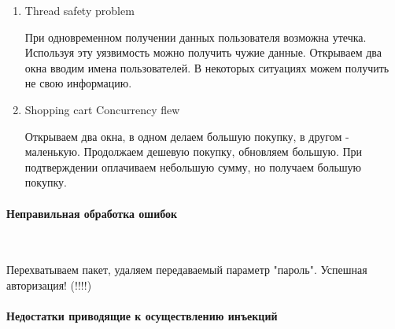 \documentclass{article}
\begin{document}
\begin{enumerate}
\item Thread safety problem

При одновременном получении данных пользователя возможна утечка. Используя эту уязвимость можно получить чужие данные. Открываем два окна вводим имена пользователей. В некоторых ситуациях можем получить не свою информацию.

\item Shopping cart Concurrency flew

Открываем два окна, в одном делаем большую покупку, в другом - маленькую. Продолжаем дешевую покупку, обновляем большую. При подтверждении оплачиваем небольшую сумму, но получаем большую покупку.
\end{enumerate}

\paragraph{Неправильная обработка ошибок}
~

Перехватываем пакет, удаляем передаваемый параметр "пароль". Успешная авторизация! (!!!!)

\paragraph{Недостатки приводящие к осуществлению инъекций}
~
\end{document}
